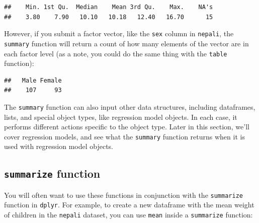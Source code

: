 \documentclass[]{book}
\makeatletter
\newenvironment{Shaded}{\begin{snugshade}}{\end{snugshade}}
\newcommand{\KeywordTok}[1]{\textcolor[rgb]{0.13,0.29,0.53}{\textbf{{#1}}}}
\newcommand{\DataTypeTok}[1]{\textcolor[rgb]{0.13,0.29,0.53}{{#1}}}
\newcommand{\StringTok}[1]{\textcolor[rgb]{0.31,0.60,0.02}{{#1}}}
\newcommand{\OtherTok}[1]{\textcolor[rgb]{0.56,0.35,0.01}{{#1}}}
\newcommand{\NormalTok}[1]{{#1}}
\newenvironment{kframe}{%
\medskip{}
\setlength{\fboxsep}{.8em}
 \def\at@end@of@kframe{}%
 \ifinner\ifhmode%
  \def\at@end@of@kframe{\end{minipage}}%
  \begin{minipage}{\columnwidth}%
 \fi\fi%
 \def\FrameCommand##1{\hskip\@totalleftmargin \hskip-\fboxsep
 \colorbox{shadecolor}{##1}\hskip-\fboxsep
     \hskip-\linewidth \hskip-\@totalleftmargin \hskip\columnwidth}%
 \MakeFramed {\advance\hsize-\width
   \@totalleftmargin\z@ \linewidth\hsize
   \@setminipage}}%
 {\par\unskip\endMakeFramed%
 \at@end@of@kframe}
\renewenvironment{Shaded}{\begin{kframe}}{\end{kframe}}
\makeatother
\begin{document}
\begin{Shaded}
\end{Shaded}

\begin{verbatim}
##    Min. 1st Qu.  Median    Mean 3rd Qu.    Max.    NA's 
##    3.80    7.90   10.10   10.18   12.40   16.70      15
\end{verbatim}

However, if you submit a factor vector, like the \texttt{sex} column in
\texttt{nepali}, the \texttt{summary} function will return a count of
how many elements of the vector are in each factor level (as a note, you
could do the same thing with the \texttt{table} function):

\begin{Shaded}
\end{Shaded}

\begin{verbatim}
##   Male Female 
##    107     93
\end{verbatim}

The \texttt{summary} function can also input other data structures,
including dataframes, lists, and special object types, like regression
model objects. In each case, it performs different actions specific to
the object type. Later in this section, we'll cover regression models,
and see what the \texttt{summary} function returns when it is used with
regression model objects.

\subsection{\texorpdfstring{\texttt{summarize}
function}{summarize function}}\label{summarize-function}

You will often want to use these functions in conjunction with the
\texttt{summarize} function in \texttt{dplyr}. For example, to create a
new dataframe with the mean weight of children in the \texttt{nepali}
dataset, you can use \texttt{mean} inside a \texttt{summarize} function:

\begin{Shaded}
\end{Shaded}
\end{document}
